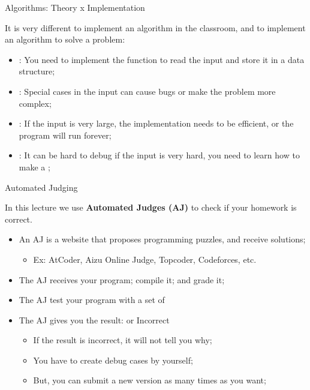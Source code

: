 \begin{frame}{Algorithms: Theory x Implementation}
  \begin{exampleblock}{}
  It is very different to implement an algorithm in the classroom, and to implement an algorithm to solve a problem:
  \end{exampleblock}
  \begin{itemize}
    \item {}: You need to implement the function to read the input and store it in a data structure;
    \item {}: Special cases in the input can cause bugs or make the problem more complex;
    \item {}: If the input is very large, the implementation
    needs to be efficient, or the program will run forever;
    \item {}: It can be hard to debug if the input is very hard, you need to learn how to make a ;
  \end{itemize}
\end{frame}

\begin{frame}{Automated Judging}
  \begin{exampleblock}{}
  In this lecture we use {\bf Automated Judges (AJ)} to check if your homework is correct.
  \end{exampleblock}

  \begin{itemize}
    \item An AJ is a website that proposes programming puzzles, and receive solutions;
    \begin{itemize}
      \item Ex: AtCoder, Aizu Online Judge, Topcoder, Codeforces, etc.
    \end{itemize}\bigskip

    \item The AJ receives your program; compile it; and grade it;\bigskip

    \item The AJ test your program with a set of \bigskip

    \item The AJ gives you the result:  or \alert{Incorrect}
    \begin{itemize}
      \item If the result is incorrect, it will not tell you why;
      \item You have to create debug cases by yourself;
      \item But, you can submit a new version as many times as you want;
    \end{itemize}
  \end{itemize}
\end{frame}

